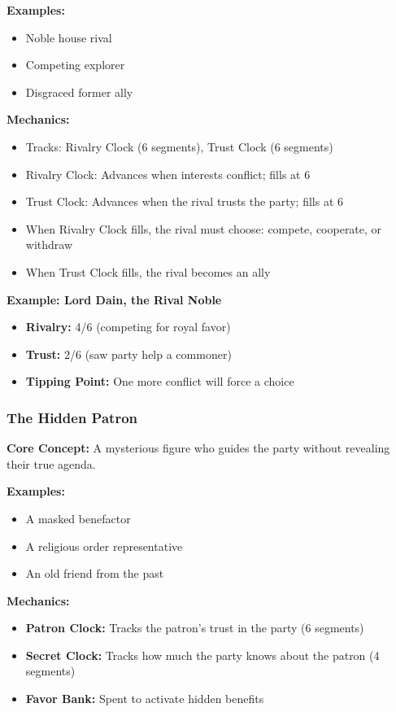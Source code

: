 \textbf{Examples:}
\begin{itemize}
  \item Noble house rival
  \item Competing explorer
  \item Disgraced former ally
\end{itemize}

\textbf{Mechanics:}
\begin{itemize}
  \item Tracks: Rivalry Clock (6 segments), Trust Clock (6 segments)
  \item Rivalry Clock: Advances when interests conflict; fills at 6
  \item Trust Clock: Advances when the rival trusts the party; fills at 6
  \item When Rivalry Clock fills, the rival must choose: compete, cooperate, or withdraw
  \item When Trust Clock fills, the rival becomes an ally
\end{itemize}

\textbf{Example: Lord Dain, the Rival Noble}
\begin{itemize}
  \item \textbf{Rivalry:} 4/6 (competing for royal favor)
  \item \textbf{Trust:} 2/6 (saw party help a commoner)
  \item \textbf{Tipping Point:} One more conflict will force a choice
\end{itemize}

\subsubsection{The Hidden Patron}

\textbf{Core Concept:} A mysterious figure who guides the party without revealing their true agenda.

\textbf{Examples:}
\begin{itemize}
  \item A masked benefactor
  \item A religious order representative
  \item An old friend from the past
\end{itemize}

\textbf{Mechanics:}
\begin{itemize}
  \item \textbf{Patron Clock:} Tracks the patron's trust in the party (6 segments)
  \item \textbf{Secret Clock:} Tracks how much the party knows about the patron (4 segments)
  \item \textbf{Favor Bank:} Spent to activate hidden benefits
\end{itemize}

